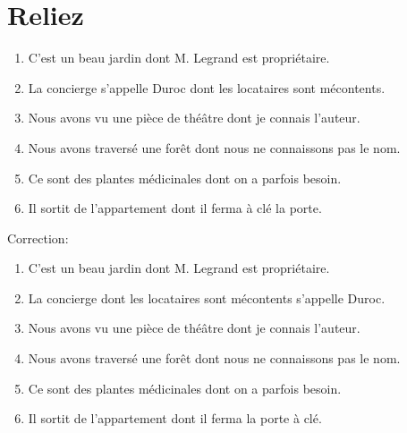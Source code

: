 \documentclass{book}
\begin{document}
    \section{Reliez}
        \begin{enumerate}
            \item C'est un beau jardin dont M. Legrand est propriétaire.
            \item La concierge s'appelle Duroc dont les locataires sont mécontents.
            \item Nous avons vu une pièce de théâtre dont je connais l'auteur.
            \item Nous avons traversé une forêt dont nous ne connaissons pas le nom.
            \item Ce sont des plantes médicinales dont on a parfois besoin.
            \item Il sortit de l'appartement dont il ferma à clé la porte.
        \end{enumerate}
        Correction:
        \begin{enumerate}
            \item C'est un beau jardin dont M. Legrand est propriétaire.
            \item La concierge dont les locataires sont mécontents s'appelle Duroc.
            \item Nous avons vu une pièce de théâtre dont je connais l'auteur.
            \item Nous avons traversé une forêt dont nous ne connaissons pas le nom.
            \item Ce sont des plantes médicinales dont on a parfois besoin.
            \item Il sortit de l'appartement dont il ferma la porte à clé.
        \end{enumerate}
\end{document}
